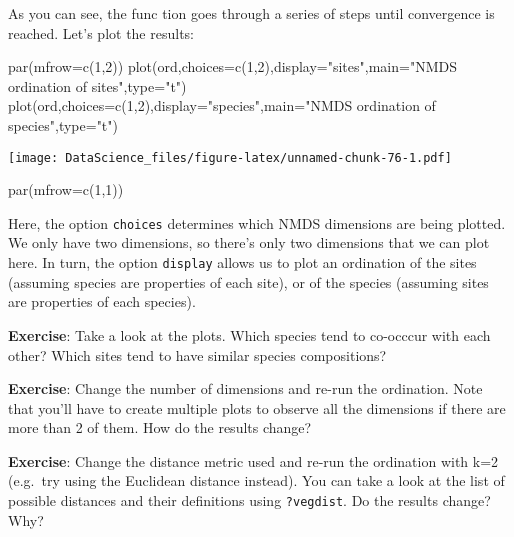 \documentclass[
]{book}
\newenvironment{Shaded}{\begin{snugshade}}{\end{snugshade}}
\newcommand{\AttributeTok}[1]{\textcolor[rgb]{0.77,0.63,0.00}{#1}}
\newcommand{\DecValTok}[1]{\textcolor[rgb]{0.00,0.00,0.81}{#1}}
\newcommand{\FunctionTok}[1]{\textcolor[rgb]{0.00,0.00,0.00}{#1}}
\newcommand{\NormalTok}[1]{#1}
\newcommand{\StringTok}[1]{\textcolor[rgb]{0.31,0.60,0.02}{#1}}
\begin{document}
As you can see, the func tion goes through a series of steps until convergence is reached. Let's plot the results:

\begin{Shaded}
\begin{Highlighting}[]
\FunctionTok{par}\NormalTok{(}\AttributeTok{mfrow=}\FunctionTok{c}\NormalTok{(}\DecValTok{1}\NormalTok{,}\DecValTok{2}\NormalTok{))}
\FunctionTok{plot}\NormalTok{(ord,}\AttributeTok{choices=}\FunctionTok{c}\NormalTok{(}\DecValTok{1}\NormalTok{,}\DecValTok{2}\NormalTok{),}\AttributeTok{display=}\StringTok{"sites"}\NormalTok{,}\AttributeTok{main=}\StringTok{"NMDS ordination of sites"}\NormalTok{,}\AttributeTok{type=}\StringTok{"t"}\NormalTok{)}
\FunctionTok{plot}\NormalTok{(ord,}\AttributeTok{choices=}\FunctionTok{c}\NormalTok{(}\DecValTok{1}\NormalTok{,}\DecValTok{2}\NormalTok{),}\AttributeTok{display=}\StringTok{"species"}\NormalTok{,}\AttributeTok{main=}\StringTok{"NMDS ordination of species"}\NormalTok{,}\AttributeTok{type=}\StringTok{"t"}\NormalTok{)}
\end{Highlighting}
\end{Shaded}

\texttt{[image: DataScience\_files/figure-latex/unnamed-chunk-76-1.pdf]}

\begin{Shaded}
\begin{Highlighting}[]
\FunctionTok{par}\NormalTok{(}\AttributeTok{mfrow=}\FunctionTok{c}\NormalTok{(}\DecValTok{1}\NormalTok{,}\DecValTok{1}\NormalTok{))}
\end{Highlighting}
\end{Shaded}

Here, the option \texttt{choices} determines which NMDS dimensions are being plotted. We only have two dimensions, so there's only two dimensions that we can plot here. In turn, the option \texttt{display} allows us to plot an ordination of the sites (assuming species are properties of each site), or of the species (assuming sites are properties of each species).

\textbf{Exercise}: Take a look at the plots. Which species tend to co-occcur with each other? Which sites tend to have similar species compositions?

\textbf{Exercise}: Change the number of dimensions and re-run the ordination. Note that you'll have to create multiple plots to observe all the dimensions if there are more than 2 of them. How do the results change?

\textbf{Exercise}: Change the distance metric used and re-run the ordination with k=2 (e.g.~try using the Euclidean distance instead). You can take a look at the list of possible distances and their definitions using \texttt{?vegdist}. Do the results change? Why?
\end{document}
